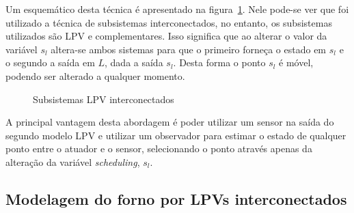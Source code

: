 Um esquemático desta técnica é apresentado na figura~\ref{fig:nelson-system}.
Nele pode-se ver que foi utilizado a técnica de subsistemas interconectados, no
entanto, os subsistemas utilizados são \ac{LPV} e complementares. Isso significa
que ao alterar o valor da variável \( s_l \) altera-se ambos sistemas para que o
primeiro forneça o estado em \( s_l \) e o segundo a saída em \( L \), dada a
saída \( s_l \). Desta forma o ponto \( s_l \) é móvel, podendo ser alterado a
qualquer momento.

\begin{figure}[ht!]
	\centering
	\captionsetup{justification=centering}
	\caption{Subsistemas LPV interconectados}%
	\label{fig:nelson-system}
\end{figure}

A principal vantagem desta abordagem é poder utilizar um sensor na saída do
segundo modelo LPV e utilizar um observador para estimar o estado de qualquer
ponto entre o atuador e o sensor, selecionando o ponto através apenas da
alteração da variável \textit{scheduling}, \( s_l \).

\subsection{Modelagem do forno por LPVs interconectados}%
\label{subsec:lpv-oven}


